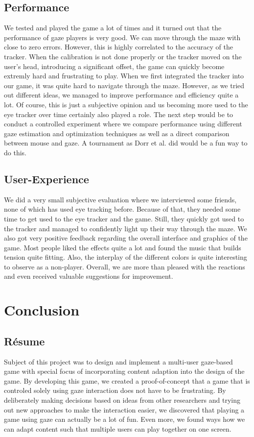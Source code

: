 \documentclass{sigchi}
\begin{document}
\subsection{Performance}
We tested and played the game a lot of times and it turned out that the performance of gaze players is very good. We can move through the maze with close to zero errors. However, this is highly correlated to the accuracy of the tracker. When the calibration is not done properly or the tracker moved on the user's head, introducing a significant offset, the game can quickly become extremly hard and frustrating to play. When we first integrated the tracker into our game, it was quite hard to navigate through the maze. However, as we tried out different ideas, we managed to improve performance and efficiency quite a lot. Of course, this is just a subjective opinion and us becoming more used to the eye tracker over time certainly also played a role. The next step would be to conduct a controlled experiment where we compare performance using different gaze estimation and optimization techniques as well as a direct comparison between mouse and gaze. A tournament as Dorr et al. \cite{dorr2009gaze} did would be a fun way to do this.

\subsection{User-Experience}
We did a very small subjective evaluation where we interviewed some friends, none of which has used eye tracking before. Because of that, they needed some time to get used to the eye tracker and the game. Still, they quickly got used to the tracker and managed to confidently light up their way through the maze. We also got very positive feedback regarding the overall interface and graphics of the game. Most people liked the effects quite a lot and found the music that builds tension quite fitting. Also, the interplay of the different colors is quite interesting to observe as a non-player. Overall, we are more than pleased with the reactions and even received valuable suggestions for improvement.

\section{Conclusion}
\subsection{R{\'e}sume}
Subject of this project was to design and implement a multi-user gaze-based game with special focus of incorporating content adaption into the design of the game. By developing this game, we created a proof-of-concept that a game that is controled solely using gaze interaction does not have to be frustrating. By deliberately making decisions based on ideas from other researchers and trying out new approaches to make the interaction easier, we discovered that playing a game using gaze can actually be a lot of fun. Even more, we found ways how we can adapt content such that multiple users can play together on one screen.
\end{document}
